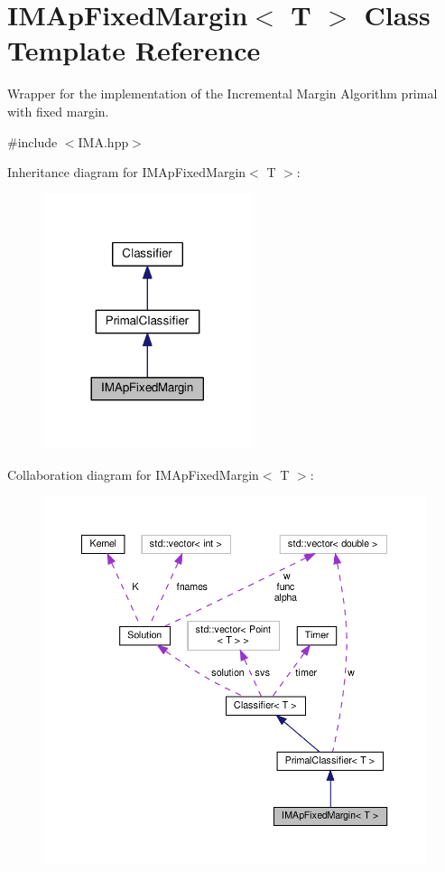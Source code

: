 \hypertarget{class_i_m_ap_fixed_margin}{}\section{I\+M\+Ap\+Fixed\+Margin$<$ T $>$ Class Template Reference}
\label{class_i_m_ap_fixed_margin}


Wrapper for the implementation of the Incremental Margin Algorithm primal with fixed margin.  




{\ttfamily \#include $<$I\+M\+A.\+hpp$>$}



Inheritance diagram for I\+M\+Ap\+Fixed\+Margin$<$ T $>$\+:\nopagebreak
\begin{figure}[H]
\begin{center}
\leavevmode
\includegraphics[width=173pt]{class_i_m_ap_fixed_margin__inherit__graph}
\end{center}
\end{figure}


Collaboration diagram for I\+M\+Ap\+Fixed\+Margin$<$ T $>$\+:
\nopagebreak
\begin{figure}[H]
\begin{center}
\leavevmode
\includegraphics[width=350pt]{class_i_m_ap_fixed_margin__coll__graph}
\end{center}
\end{figure}
